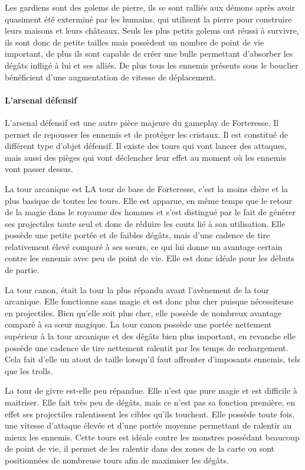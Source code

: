 \documentclass[a4paper, 12pt]{article}
\begin{document}
\par Les gardiens sont des golems de pierre, ils se sont ralliés aux démons après avoir quasiment été exterminé par les humains, qui utilisent la pierre pour construire leurs maisons et leurs châteaux. Seuls les plus petits golems ont réussi à survivre, ils sont donc de petite tailles mais possèdent un nombre de point de vie important, de plus ils sont capable de créer une bulle permettant d’absorber les dégâts infligé à lui et ses alliés. De plus tous les ennemis présents sous le bouclier bénéficient d’une augmentation de vitesse de déplacement.
			\paragraph{L'arsenal défensif}
			
			L’arsenal défensif est une autre pièce majeure du gameplay de Forteresse. Il permet de repousser les ennemis et de protéger les cristaux. Il est constitué de différent type d’objet défensif. Il existe des tours qui vont lancer des attaques, mais aussi des pièges qui vont déclencher leur effet au moment où les ennemis vont passer dessus. 
\par La tour arcanique est LA tour de base de Forteresse, c’est la moins chère et la plus basique de toutes les tours. Elle est apparue, en même temps que le retour de la magie dans le royaume des hommes et s’est distingué par le fait de générer ses projectiles toute seul et donc de réduire les couts lié à son utilisation. Elle possède une petite portée et de faibles dégâts, mais d’une cadence de tire relativement élevé comparé à ses sœurs, ce qui lui donne un avantage certain contre les ennemis avec peu de point de vie. Elle est donc idéale pour les débuts de partie.
\par La tour canon, était la tour la plus répandu  avant l’avènement de la tour arcanique. Elle fonctionne sans magie et est donc plus cher puisque nécessiteuse en projectiles. Bien qu’elle soit plus cher, elle possède de nombreux avantage comparé à sa sœur magique. La tour canon possède une portée nettement supérieur à la tour arcanique et des dégâts bien plus important, en revanche elle possède une cadence de tire nettement ralentit par les temps de rechargement. Cela fait d’elle un atout de taille lorsqu’il faut affronter d’imposants ennemis, tels que les trolls.
\par La tour de givre est-elle peu répandue. Elle n’est que pure magie et est difficile à maitriser. Elle fait très peu de dégâts, mais ce n’est pas sa fonction première, en effet ses projectiles ralentissent les cibles qu’ils touchent. Elle possède toute fois, une vitesse d’attaque élevée et d’une portée moyenne permettant de ralentir au mieux les ennemis. Cette tours est idéale contre les monstres possédant beaucoup de point de vie, il permet de les ralentir dans des zones de la carte ou sont positionnées de nombreuse tours afin de maximiser les dégâts.
\end{document}
